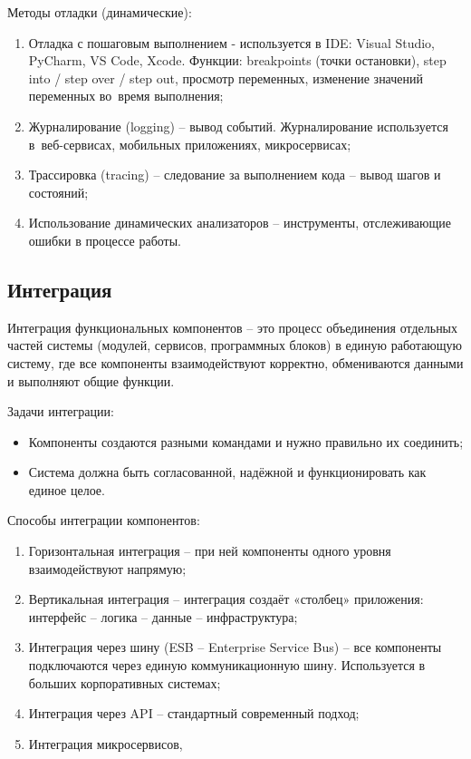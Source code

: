 \documentclass{ou}
\begin{document}
Методы отладки (динамические):
\begin{enumerate}[leftmargin=0em, itemindent=3.75em, nosep, label=\arabic*)]
\item Отладка с пошаговым выполнением - используется в IDE: Visual Studio, PyCharm, VS Code, Xcode. Функции: breakpoints (точки остановки), step into / step over / step out, просмотр переменных, изменение значений переменных во~время выполнения;
\item Журналирование (logging) -- вывод событий. Журналирование используется в~веб-сервисах, мобильных приложениях, микросервисах;
\item Трассировка (tracing) -- следование за выполнением кода -- вывод шагов и состояний;
\item Использование динамических анализаторов -- инструменты, отслеживающие ошибки в процессе работы.
\end{enumerate}
\subsection{Интеграция}
Интеграция функциональных компонентов -- это процесс объединения отдельных частей системы (модулей, сервисов, программных блоков) в единую работающую систему, где все компоненты взаимодействуют корректно, обмениваются данными и выполняют общие функции.

Задачи интеграции:
\begin{itemize}[label=-, leftmargin=0em, itemindent=3.35em, nosep]
\item Компоненты создаются разными командами и нужно правильно их соединить;
\item Система должна быть согласованной, надёжной и функционировать как единое целое.
\end{itemize}

Способы интеграции компонентов:
\begin{enumerate}[leftmargin=0em, itemindent=3.75em, nosep, label=\arabic*)]
\item Горизонтальная интеграция -- при ней компоненты одного уровня взаимодействуют напрямую; 
\item Вертикальная интеграция -- интеграция создаёт «столбец» приложения: интерфейс -- логика -- данные -- инфраструктура;
\item Интеграция через шину (ESB -- Enterprise Service Bus) -- все компоненты подключаются через единую коммуникационную шину. Используется в больших корпоративных системах;
\item Интеграция через API -- стандартный современный подход;
\item Интеграция микросервисов,
\end{enumerate}
\end{document}
